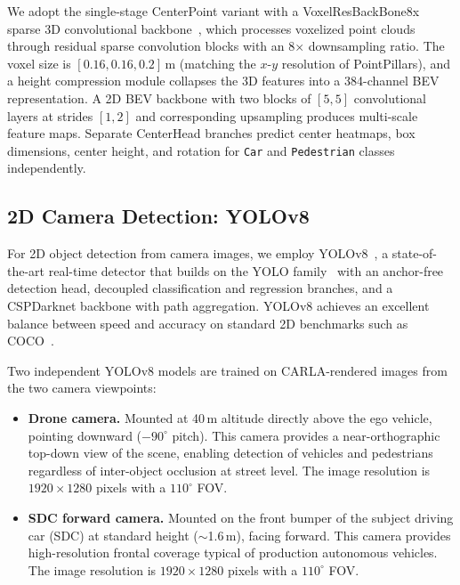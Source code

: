 \documentclass[sustainability,article,submit,moreauthors,pdftex]{Definitions/mdpi}
\begin{document}
We adopt the single-stage CenterPoint variant with a VoxelResBackBone8x sparse 3D convolutional backbone~\cite{yan2018second}, which processes voxelized point clouds through residual sparse convolution blocks with an 8$\times$ downsampling ratio. The voxel size is $[0.16, 0.16, 0.2]$\,m (matching the $x$-$y$ resolution of PointPillars), and a height compression module collapses the 3D features into a 384-channel BEV representation. A 2D BEV backbone with two blocks of $[5, 5]$ convolutional layers at strides $[1, 2]$ and corresponding upsampling produces multi-scale feature maps. Separate CenterHead branches predict center heatmaps, box dimensions, center height, and rotation for \texttt{Car} and \texttt{Pedestrian} classes independently.

\subsection{2D Camera Detection: YOLOv8}\label{sec:yolov8}

For 2D object detection from camera images, we employ YOLOv8~\cite{jocher2023yolov8}, a state-of-the-art real-time detector that builds on the YOLO family~\cite{redmon2016yolo} with an anchor-free detection head, decoupled classification and regression branches, and a CSPDarknet backbone with path aggregation. YOLOv8 achieves an excellent balance between speed and accuracy on standard 2D benchmarks such as COCO~\cite{lin2014coco}.

Two independent YOLOv8 models are trained on CARLA-rendered images from the two camera viewpoints:

\begin{itemize}[leftmargin=*,labelsep=5.8mm]
\item \textbf{Drone camera.} Mounted at 40\,m altitude directly above the ego vehicle, pointing downward ($-90^\circ$ pitch). This camera provides a near-orthographic top-down view of the scene, enabling detection of vehicles and pedestrians regardless of inter-object occlusion at street level. The image resolution is $1920 \times 1280$ pixels with a $110^\circ$ FOV.
\item \textbf{SDC forward camera.} Mounted on the front bumper of the subject driving car (SDC) at standard height ($\sim$1.6\,m), facing forward. This camera provides high-resolution frontal coverage typical of production autonomous vehicles. The image resolution is $1920 \times 1280$ pixels with a $110^\circ$ FOV.
\end{itemize}
\end{document}
